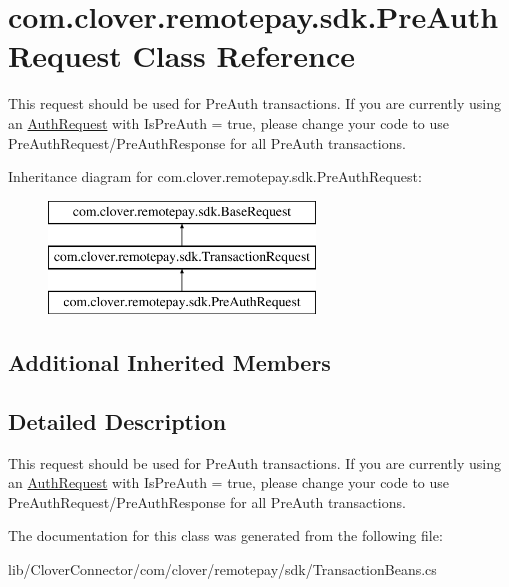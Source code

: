 \hypertarget{classcom_1_1clover_1_1remotepay_1_1sdk_1_1_pre_auth_request}{}\section{com.\+clover.\+remotepay.\+sdk.\+Pre\+Auth\+Request Class Reference}
\label{classcom_1_1clover_1_1remotepay_1_1sdk_1_1_pre_auth_request}


This request should be used for Pre\+Auth transactions. If you are currently using an \hyperlink{classcom_1_1clover_1_1remotepay_1_1sdk_1_1_auth_request}{Auth\+Request} with Is\+Pre\+Auth = true, please change your code to use Pre\+Auth\+Request/\+Pre\+Auth\+Response for all Pre\+Auth transactions.  


Inheritance diagram for com.\+clover.\+remotepay.\+sdk.\+Pre\+Auth\+Request\+:\begin{figure}[H]
\begin{center}
\leavevmode
\includegraphics[height=3.000000cm]{classcom_1_1clover_1_1remotepay_1_1sdk_1_1_pre_auth_request}
\end{center}
\end{figure}
\subsection*{Additional Inherited Members}


\subsection{Detailed Description}
This request should be used for Pre\+Auth transactions. If you are currently using an \hyperlink{classcom_1_1clover_1_1remotepay_1_1sdk_1_1_auth_request}{Auth\+Request} with Is\+Pre\+Auth = true, please change your code to use Pre\+Auth\+Request/\+Pre\+Auth\+Response for all Pre\+Auth transactions. 



The documentation for this class was generated from the following file\+:\begin{DoxyCompactItemize}
\item 
lib/\+Clover\+Connector/com/clover/remotepay/sdk/Transaction\+Beans.\+cs\end{DoxyCompactItemize}
